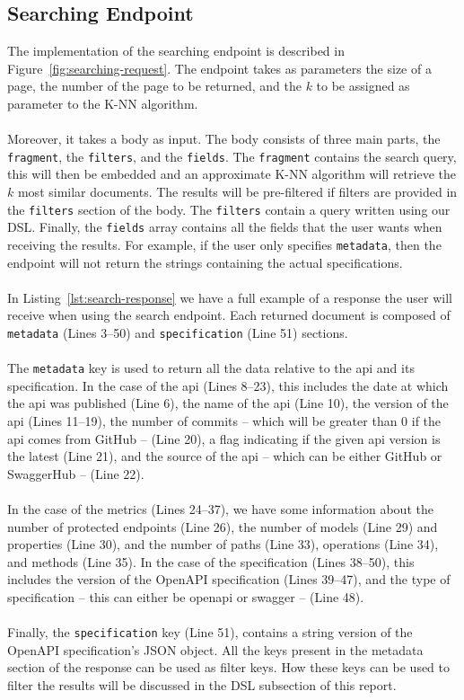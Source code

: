 \subsection{Searching Endpoint}\label{subsec:searching-endpoint}
The implementation of the searching endpoint is described in Figure~\ref{fig:searching-request}.
The endpoint takes as parameters the size of a page, the number of the page to be returned, and the $k$ to be assigned as parameter to the K-NN algorithm. \\ \\
Moreover, it takes a body as input.
The body consists of three main parts, the \verb|fragment|, the \verb|filters|, and the \verb|fields|.
The \verb|fragment| contains the search query, this will then be embedded and an approximate K-NN algorithm will retrieve the $k$ most similar documents.
The results will be pre-filtered if filters are provided in the \verb|filters| section of the body.
The \verb|filters| contain a query written using our DSL\@.
Finally, the \verb|fields| array contains all the fields that the user wants when receiving the results.
For example, if the user only specifies \verb|metadata|, then the endpoint will not return the strings containing the actual specifications. \\ \\
In Listing~\ref{lst:search-response} we have a full example of a response the user will receive when using the search endpoint.
Each returned document is composed of \verb|metadata| (Lines 3--50) and \verb|specification| (Line 51) sections. \\ \\
The \verb|metadata| key is used to return all the data relative to the api and its specification.
In the case of the api (Lines 8--23), this includes the date at which the api was published (Line 6), the name of the api (Line 10), the version of the api (Lines 11--19), the number of commits -- which will be greater than 0 if the api comes from GitHub -- (Line 20), a flag indicating if the given api version is the latest (Line 21), and the source of the api -- which can be either GitHub or SwaggerHub -- (Line 22). \\ \\
In the case of the metrics (Lines 24--37), we have some information about the number of protected endpoints (Line 26), the number of models (Line 29) and properties (Line 30), and the number of paths (Line 33), operations (Line 34), and methods (Line 35).
In the case of the specification (Lines 38--50), this includes the version of the OpenAPI specification (Lines 39--47), and the type of specification -- this can either be openapi or swagger -- (Line 48). \\ \\
Finally, the \verb|specification| key (Line 51), contains a string version of the OpenAPI specification's JSON object.
All the keys present in the metadata section of the response can be used as filter keys.
How these keys can be used to filter the results will be discussed in the DSL subsection of this report.

